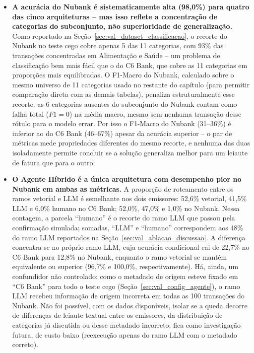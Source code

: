 \begin{itemize}
	\item \textbf{A acurácia do Nubank é sistematicamente alta (98,0\%) para quatro das cinco arquiteturas -- mas isso reflete a concentração de categorias do subconjunto, não superioridade de generalização.} Como reportado na Seção~\ref{sec:val_dataset_classificacao}, o recorte do Nubank no teste cego cobre apenas 5 das 11 categorias, com 93\% das transações concentradas em Alimentação e Saúde -- um problema de classificação bem mais fácil que o do C6 Bank, que cobre as 11 categorias em proporções mais equilibradas. O F1-Macro do Nubank, calculado sobre o mesmo universo de 11 categorias usado no restante do capítulo (para permitir comparação direta com as demais tabelas), penaliza estruturalmente esse recorte: as 6 categorias ausentes do subconjunto do Nubank contam como falha total ($F1=0$) na média macro, mesmo sem nenhuma transação desse rótulo para o modelo errar. Por isso o F1-Macro do Nubank (31--36\%) é inferior ao do C6 Bank (46--67\%) apesar da acurácia superior -- o par de métricas mede propriedades diferentes do mesmo recorte, e nenhuma das duas isoladamente permite concluir se a solução generaliza melhor para um leiaute de fatura que para o outro;
	\item \textbf{O Agente Híbrido é a única arquitetura com desempenho pior no Nubank em ambas as métricas.} A proporção de roteamento entre os ramos vetorial e LLM é semelhante nos dois emissores: 52,6\% vetorial, 41,5\% LLM e 6,0\% humano no C6 Bank; 52,0\%, 47,0\% e 1,0\% no Nubank. Nessa contagem, a parcela ``humano'' é o recorte do ramo LLM que passou pela confirmação simulada; somadas, ``LLM'' e ``humano'' correspondem aos 48\% do ramo LLM reportados na Seção~\ref{sec:val_ablacao_discussao}. A diferença concentra-se no próprio ramo LLM, cuja acurácia condicional cai de 22,7\% no C6 Bank para 12,8\% no Nubank, enquanto o ramo vetorial se mantém equivalente ou superior (96,7\% e 100,0\%, respectivamente). Há, ainda, um confundidor não controlado: como o metadado de origem esteve fixado em ``C6 Bank'' para todo o teste cego (Seção~\ref{sec:val_config_agente}), o ramo LLM recebeu informação de origem incorreta em todas as 100 transações do Nubank. Não foi possível, com os dados disponíveis, isolar se a queda decorre de diferenças de leiaute textual entre os emissores, da distribuição de categorias já discutida ou desse metadado incorreto; fica como investigação futura, de custo baixo (reexecução apenas do ramo LLM com o metadado correto).
\end{itemize}

